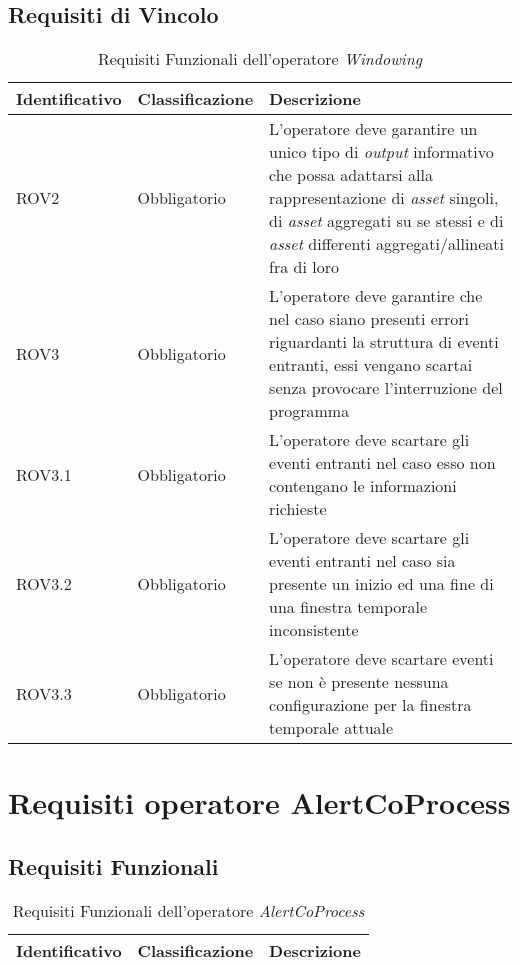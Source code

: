 \subsection{Requisiti di Vincolo}
{
\centering
\begin{longtable}{L{3cm} L{3cm} L{7.5cm}}
\caption{Requisiti Funzionali dell'operatore \textit{Windowing}}\\
\textbf{Identificativo} &
\textbf{Classificazione}&
\textbf{Descrizione}\\
\endhead
\hline

ROV2 & Obbligatorio & L'operatore deve garantire un unico tipo di \textit{output} informativo che possa adattarsi alla rappresentazione di \textit{asset} singoli, di \textit{asset} aggregati su se stessi e di \textit{asset} differenti aggregati/allineati fra di loro \\
\hline
ROV3 & Obbligatorio & L'operatore deve garantire che nel caso siano presenti errori riguardanti la struttura di eventi entranti, essi vengano scartai senza provocare l'interruzione del programma\\
\hline
ROV3.1 & Obbligatorio & L'operatore deve scartare gli eventi entranti nel caso esso non contengano le informazioni richieste\\
\hline
ROV3.2 & Obbligatorio & L'operatore deve scartare gli eventi entranti nel caso sia presente un inizio ed una fine di una finestra temporale inconsistente\\
\hline
ROV3.3 & Obbligatorio & L'operatore deve scartare eventi se non è presente nessuna configurazione per la finestra temporale attuale\\
\hline
\end{longtable}
}



\section{Requisiti operatore AlertCoProcess}
\subsection{Requisiti Funzionali}
{
\centering
\begin{longtable}{L{3cm} L{3cm} L{7.5cm}}
\caption{Requisiti Funzionali dell'operatore \textit{AlertCoProcess}}\\
\textbf{Identificativo} &
\textbf{Classificazione}&
\textbf{Descrizione}\\
\endhead
\hline
\hline
\end{longtable}
}


